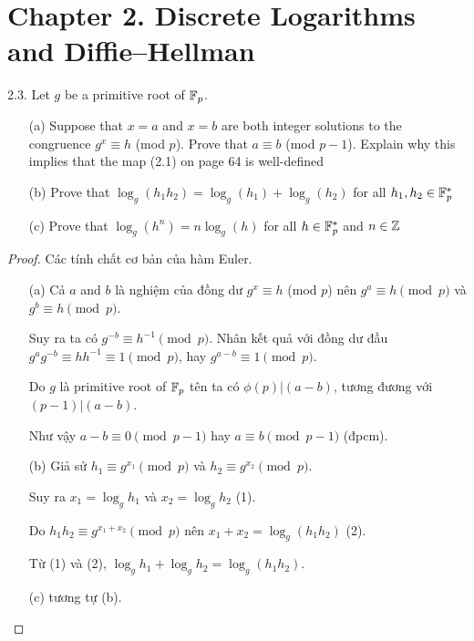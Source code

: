 \section*{Chapter 2. Discrete Logarithms and Diffie–Hellman}

2.3. Let $g$ be a primitive root of $\mathbb{F}_p$.

\begin{enumerate}
    \item [(a)] Suppose that $x = a$ and $x = b$ are both integer solutions to the congruence $g^x \equiv h$ (mod $p$). Prove that $a \equiv b$ (mod $p-1$). Explain why this implies that the map (2.1) on page 64 is well-defined
    \item [(b)] Prove that $\log_g(h_1 h_2) = \log_g(h_1) + \log_g(h_2)$ for all $h_1, h_2 \in \mathbb{F}^*_p$
    \item [(c)] Prove that $\log_g(h^n) = n\log_g(h)$ for all $h \in \mathbb{F}^{*}_p$ and $n \in \mathbb{Z}$
\end{enumerate}

\begin{proof}
    Các tính chất cơ bản của hàm Euler.
    \begin{enumerate}
        \item[(a)] Cả $a$ and $b$ là nghiệm của đồng dư $g^x \equiv h$ (mod $p$) nên $g^a \equiv h \pmod p$ và $g^b \equiv h \pmod p$. 
        
        Suy ra ta có $g^{-b} \equiv h^{-1} \pmod p$. Nhân kết quả với đồng dư đầu $g^a g^{-b} \equiv h h^{-1} \equiv 1 \pmod p$, hay $g^{a-b} \equiv 1 \pmod p$. 
        
        Do $g$ là primitive root of $\mathbb{F}_p$ tên ta có $\phi(p) \vert (a-b)$, tương đương với $(p-1) \vert (a-b)$.

        Như vậy $a - b \equiv 0 \pmod{p-1}$ hay $a \equiv b \pmod {p-1}$ (đpcm).

        \item[(b)] Giả sử $h_1 \equiv g^{x_1} \pmod p$ và $h_2 \equiv g^{x_2} \pmod p$.

        Suy ra $x_1 = \log_g h_1$ và $x_2 = \log_g h_2$ (1).
        
        Do $h_1 h_2 \equiv g^{x_1 + x_2} \pmod p$ nên $x_1 + x_2 = \log_g(h_1 h_2)$ (2).
        
        Từ (1) và (2), $\log_g h_1 + \log_g h_2 = \log_g (h_1 h_2)$.
        
        \item[(c)] tương tự (b).
    \end{enumerate}
\end{proof}

